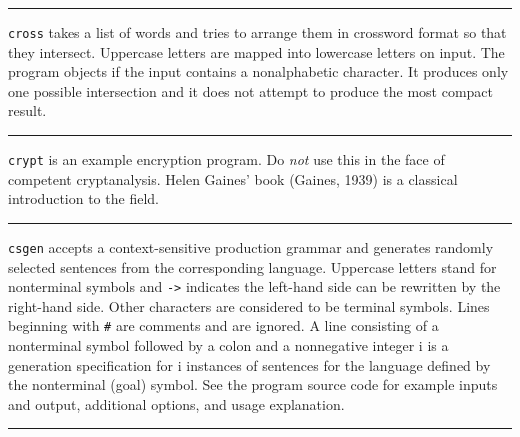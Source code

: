 {\vspace{0.25cm}\hrule{}

\texttt{cross} takes a list of words and tries to arrange them in
crossword format so that they intersect. Uppercase letters are mapped
into lowercase letters on input. The program objects if the input
contains a nonalphabetic character. It produces only one possible
intersection and it does not attempt to produce the most compact
result. 

\vspace{0.25cm}\hrule{}

\texttt{crypt} is an example encryption program. Do
\textit{not} use this in the face of competent cryptanalysis. Helen
Gaines' book (Gaines, 1939) is a classical
introduction to the field.

\vspace{0.25cm}\hrule{}

\texttt{csgen} accepts a context-sensitive production grammar and
generates randomly selected sentences from the corresponding language.
Uppercase letters stand for nonterminal symbols and
\texttt{{}-{\textgreater}} indicates the left-hand side can be
rewritten by the right-hand side. Other characters are considered to be
terminal symbols. Lines beginning with \texttt{\#} are comments and are
ignored. A line consisting of a nonterminal symbol followed by a colon
and a nonnegative integer i is a generation specification for i
instances of sentences for the language defined by the nonterminal
(goal) symbol. See the program source code for example inputs and output,
additional options, and usage explanation.


\vspace{0.25cm}\hrule{}}
